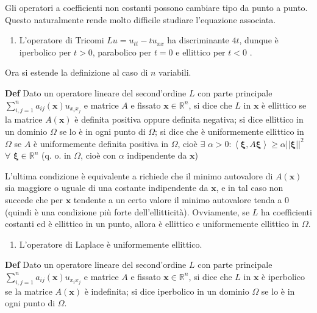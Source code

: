\documentclass{article}
\begin{document}
Gli operatori a coefficienti non costanti possono cambiare tipo da punto a
punto. Questo naturalmente rende molto difficile studiare l'equazione
associata.

\begin{enumerate}
\item L'operatore di Tricomi $Lu=u_{tt}-tu_{xx}$ ha discriminante $4t$,
dunque \`{e} iperbolico per $t>0$, parabolico per $t=0$ e ellittico per $t<0$%
.
\end{enumerate}

Ora si estende la definizione al caso di $n$ variabili.

\textbf{Def} Dato un operatore lineare del second'ordine $L$ con parte
principale $\sum_{i,j=1}^{n}a_{ij}\left( \mathbf{x}\right) u_{x_{i}x_{j}}$ e
matrice $A$ e fissato $\mathbf{x}\in 
\mathbb{R}
^{n}$, si dice che $L$ in $\mathbf{x}$ \`{e} ellittico se la matrice $%
A\left( \mathbf{x}\right) $ \`{e} definita positiva oppure definita
negativa; si dice ellittico in un dominio $\Omega $ se lo \`{e} in ogni
punto di $\Omega $; si dice che \`{e} uniformemente ellittico in $\Omega $
se $A$ \`{e} uniformemente definita positiva in $\Omega $, cio\`{e} $\exists 
$ $\alpha >0:\left\langle \mathbf{\xi },A\mathbf{\xi }\right\rangle \geq
\alpha \left\vert \left\vert \mathbf{\xi }\right\vert \right\vert ^{2}$ $%
\forall $ $\mathbf{\xi }\in 
\mathbb{R}
^{n}$ (q. o. in $\Omega $, cio\`{e} con $\alpha $ indipendente da $\mathbf{x}
$)

L'ultima condizione \`{e} equivalente a richiede che il minimo autovalore di 
$A\left( \mathbf{x}\right) $ sia maggiore o uguale di una costante
indipendente da $\mathbf{x}$, e in tal caso non succede che per $\mathbf{x}$
tendente a un certo valore il minimo autovalore tenda a $0$ (quindi \`{e}
una condizione pi\`{u} forte dell'ellitticit\`{a}). Ovviamente, se $L$ ha
coefficienti costanti ed \`{e} ellittico in un punto, allora \`{e} ellittico
e uniformemente ellittico in $\Omega $.

\begin{enumerate}
\item L'operatore di Laplace \`{e} uniformemente ellittico.
\end{enumerate}

\textbf{Def} Dato un operatore lineare del second'ordine $L$ con parte
principale $\sum_{i,j=1}^{n}a_{ij}\left( \mathbf{x}\right) u_{x_{i}x_{j}}$ e
matrice $A$ e fissato $\mathbf{x}\in 
\mathbb{R}
^{n}$, si dice che $L$ in $\mathbf{x}$ \`{e} iperbolico se la matrice $%
A\left( \mathbf{x}\right) $ \`{e} indefinita; si dice iperbolico in un
dominio $\Omega $ se lo \`{e} in ogni punto di $\Omega $.
\end{document}

